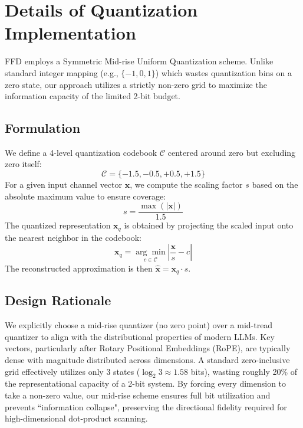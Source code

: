 \documentclass[]{mosi}
\theoremstyle{plain}
\theoremstyle{definition}
\theoremstyle{remark}
\begin{document}



\appendix
\appendix

\section{Details of Quantization Implementation}
\label{app:quant}

FFD employs a Symmetric Mid-rise Uniform Quantization scheme. Unlike standard integer mapping (e.g., $\{-1, 0, 1\}$) which wastes quantization bins on a zero state, our approach utilizes a strictly non-zero grid to maximize the information capacity of the limited 2-bit budget.

\subsection{Formulation}

We define a 4-level quantization codebook $\mathcal{C}$ centered around zero but excluding zero itself:
\begin{equation}
    \mathcal{C} = \{-1.5, -0.5, +0.5, +1.5\}
\end{equation}
For a given input channel vector $\mathbf{x}$, we compute the scaling factor $s$ based on the absolute maximum value to ensure coverage:
\begin{equation}
    s = \frac{\max(|\mathbf{x}|)}{1.5}
\end{equation}
The quantized representation $\mathbf{x}_q$ is obtained by projecting the scaled input onto the nearest neighbor in the codebook:
\begin{equation}
    \mathbf{x}_q = \underset{c \in \mathcal{C}}{\arg\min} \left| \frac{\mathbf{x}}{s} - c \right|
\end{equation}
The reconstructed approximation is then $\hat{\mathbf{x}} = \mathbf{x}_q \cdot s$.

\subsection{Design Rationale}

We explicitly choose a mid-rise quantizer (no zero point) over a mid-tread quantizer to align with the distributional properties of modern LLMs. Key vectors, particularly after Rotary Positional Embeddings (RoPE), are typically dense with magnitude distributed across dimensions. A standard zero-inclusive grid effectively utilizes only 3 states ($\log_2 3 \approx 1.58$ bits), wasting roughly 20\% of the representational capacity of a 2-bit system. By forcing every dimension to take a non-zero value, our mid-rise scheme ensures full bit utilization and prevents ``information collapse", preserving the directional fidelity required for high-dimensional dot-product scanning.
\end{document}
